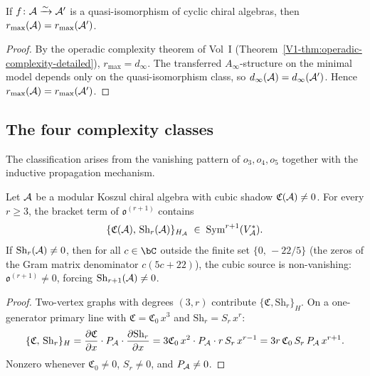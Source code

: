 \begin{proposition}
\ClaimStatusProvedHere
{}
If $f\colon \mathcal{A} \xrightarrow{\sim} \mathcal{A}'$ is a quasi-isomorphism
of cyclic chiral algebras, then
$r_{\max}(\mathcal{A}) = r_{\max}(\mathcal{A}')$.
\end{proposition}

\begin{proof}
By the operadic complexity theorem of Vol~I
\textup{(}Theorem~\textup{\ref*{V1-thm:operadic-complexity-detailed}}\textup{)},
$r_{\max} = d_\infty$. The transferred $A_\infty$-structure on the
minimal model depends only on the quasi-isomorphism class, so
$d_\infty(\mathcal{A}) = d_\infty(\mathcal{A}')$. Hence
$r_{\max}(\mathcal{A}) = r_{\max}(\mathcal{A}')$.
\end{proof}



\subsection{The four complexity classes}

The classification arises from the vanishing pattern of
$o_3, o_4, o_5$ together with the inductive propagation mechanism.

\begin{lemma}
\label{lem:thqg-cubic-source}
\ClaimStatusProvedHere
{}
Let $\mathcal{A}$ be a modular Koszul chiral algebra with cubic
shadow $\mathfrak{C}(\mathcal{A}) \neq 0$. For every $r \geq 3$,
the bracket term of $\mathfrak{o}^{(r+1)}$ contains
\begin{equation}%
\{\mathfrak{C}(\cA),\, \mathrm{Sh}_r(\cA)\}_{H_\cA}
\;\in\;
\operatorname{Sym}^{r+1}(V_\cA^*).
\end{equation}
If $\mathrm{Sh}_r(\mathcal{A}) \neq 0$, then for all $c \in \bC$
outside the finite set $\{0,\, -22/5\}$ (the zeros of the
Gram matrix denominator $c(5c+22)$), the cubic source is
non-vanishing: $\mathfrak{o}^{(r+1)} \neq 0$, forcing
$\mathrm{Sh}_{r+1}(\mathcal{A}) \neq 0$.
\end{lemma}

\begin{proof}
Two-vertex graphs with degrees $(3, r)$ contribute
$\{\mathfrak{C}, \mathrm{Sh}_r\}_H$. On a one-generator
primary line with $\mathfrak{C} = \mathfrak{C}_0\,x^3$ and
$\mathrm{Sh}_r = S_r\,x^r$:
\begin{equation}%
\{\mathfrak{C},\, \mathrm{Sh}_r\}_{H}
= \frac{\partial\mathfrak{C}}{\partial x}
 \cdot P_\cA \cdot
 \frac{\partial\mathrm{Sh}_r}{\partial x}
= 3\mathfrak{C}_0\,x^2 \cdot P_\cA \cdot r\,S_r\,x^{r-1}
= 3r\,\mathfrak{C}_0\,S_r\,P_\cA\,x^{r+1}.
\end{equation}
Nonzero whenever $\mathfrak{C}_0 \neq 0$, $S_r \neq 0$,
and $P_{\mathcal{A}} \neq 0$.
\end{proof}

